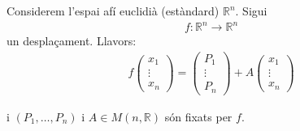 Considerem l'espai afí euclidià (estàndard) $\mathbb{R}^{n}$. Sigui
\begin{align}
    f: \mathbb{R}^{n} \to \mathbb{R}^{n}
\end{align}
un desplaçament. Llavors:
\begin{align}
    f \begin{pmatrix} x_{1} \\ \vdots \\ x_{n} \end{pmatrix} = \begin{pmatrix} P_{1} \\ \vdots \\ P_{n} \end{pmatrix} + A \begin{pmatrix} x_{1} \\ \vdots \\ x_{n} \end{pmatrix}
\end{align}

i $(P_{1}, \dots, P_{n})$ i $A \in M(n, \mathbb{R})$ són fixats per $f$.